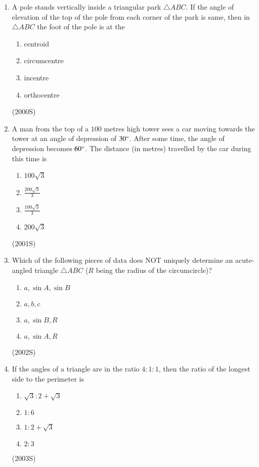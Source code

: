 \documentclass[journal,12pt,twocolumn]{IEEEtran}
\theoremstyle{remark}
\begin{document}
\begin{enumerate}
\item A pole stands vertically inside a triangular park $\triangle ABC$. If the angle of elevation of the top of the pole from each corner of the park is same, then in $\triangle ABC$ the foot of the pole is at the
\begin{enumerate}[label = (\alph*)]
\item centroid
\item circumcentre
\item incentre
\item orthocentre
\end{enumerate}
\hfill (2000S)

\item A man from the top of a $100$ metres high tower sees a car moving towards the tower at an angle of depression of $30\degree$. After some time, the angle of depression becomes $60\degree$. The distance (in metres) travelled by the car during this time is
\begin{enumerate}[label = (\alph*)]
\item $100\sqrt{3}$
\item $\frac{200\sqrt{3}}{3}$
\item $\frac{100\sqrt{3}}{3}$
\item $200\sqrt{3}$
\end{enumerate}
\hfill (2001S)

\item Which of the following pieces of data does NOT uniquely determine an acute-angled triangle $\triangle ABC$ ($R$ being the radius of the circumcircle)?
\begin{enumerate}[label = (\alph*)]
\item $a, \sin A, \sin B$
\item $a, b, c$
\item $a, \sin B, R$
\item $a, \sin A, R$
\end{enumerate}
\hfill (2002S)

\item If the angles of a triangle are in the ratio $4:1:1$, then the ratio of the longest side to the perimeter is
\begin{enumerate}[label = (\alph*)]
\item $\sqrt{3}:2+\sqrt{3}$
\item $1:6$
\item $1:2+\sqrt{3}$
\item $2:3$
\end{enumerate}
\hfill (2003S)


\end{enumerate}
\end{document}
